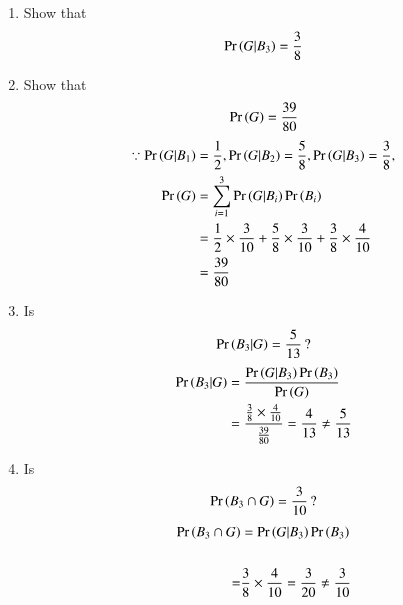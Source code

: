 \documentclass[journal,12pt,twocolumn]{IEEEtran}
\renewcommand\thesection{\arabic{section}}
\begin{document}
\begin{enumerate}[label=\thesection.\arabic*
,ref=\thesection.\theenumi]
\item Show that 
\begin{align}
\Pr\left(G|B_3\right) = \frac{3}{8}
\end{align}
\item Show that 
\begin{align}
\Pr\left(G\right) = \frac{39}{80} 
\end{align}
\solution 
\begin{align}
\because \Pr\left(G|B_1\right) &= \frac{1}{2}, \Pr\left(G|B_2\right) = \frac{5}{8}, \Pr\left(G|B_3\right) = \frac{3}{8},
\nonumber \\
\Pr\left(G\right) &= \sum_{i=1}^{3}\Pr\left(G|B_i\right)\Pr\left(B_i\right)
\\
 &= \frac{1}{2}\times\frac{3}{10}+\frac{5}{8} \times\frac{3}{10}+\frac{3}{8}\times \frac{4}{10}
\\
 &= \frac{39}{80}
\end{align}
\item Is
\begin{align}
\Pr\left(B_3|G\right) = \frac{5}{13}\, ?
\end{align}
\solution 
\begin{align}
\Pr\left(B_3|G\right) &= \frac{\Pr\left(G|B_3\right)\Pr\left(B_3\right)}{\Pr\left(G\right)}
\\
&= \frac{\frac{3}{8}\times \frac{4}{10}}{\frac{39}{80}} = \frac{4}{13} \ne \frac{5}{13}
\end{align}
\item Is
\begin{align}
\Pr\left(B_3 \cap G\right) = \frac{3}{10}\, ?
\end{align}
\solution 
\begin{align}
\Pr\left(B_3 \cap G\right) &= \Pr\left(G|B_3\right)\Pr\left(B_3\right) \\
\\
=& \frac{3}{8} \times \frac{4}{10}=\frac{3}{20}\ne\frac{3}{10}
\end{align}
\end{enumerate}
\end{document}

